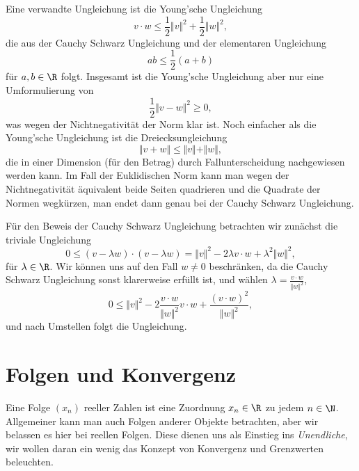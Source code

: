 \documentclass[letterpaper,10pt,english]{jupyterBook}
\begin{document}
Eine verwandte Ungleichung ist die Young’sche Ungleichung
\begin{equation*}
  v \cdot w \leq \frac{1}2 \Vert v \Vert^2 + \frac{1}2\Vert w  \Vert^2,\end{equation*}
die aus der Cauchy Schwarz Ungleichung und der elementaren Ungleichung
\begin{equation*}
 ab \leq \frac{1}2 (a+b)\end{equation*}
für \(a,b \in \R\) folgt. Insgesamt ist die Young’sche Ungleichung aber nur eine Umformulierung von
\begin{equation*}
 \frac{1}2 \Vert v - w \Vert^2 \geq 0,\end{equation*}
was wegen der Nichtnegativität der Norm klar ist. Noch einfacher als die Young’sche Ungleichung ist die Dreiecksungleichung
\begin{equation*}
 \Vert v + w\Vert \leq \Vert v \Vert + \Vert w \Vert,\end{equation*}
die in einer Dimension (für den Betrag) durch Fallunterscheidung nachgewiesen werden kann. Im Fall der Euklidischen Norm kann man wegen der Nichtnegativität äquivalent beide Seiten quadrieren und die Quadrate der Normen wegkürzen, man endet dann genau bei der Cauchy Schwarz Ungleichung.

Für den Beweis der Cauchy Schwarz Ungleichung betrachten wir zunächst die triviale Ungleichung
\begin{equation*}
 0 \leq (v-\lambda w)\cdot (v-\lambda w) = \Vert v \Vert^2 - 2 \lambda v \cdot w + \lambda^2 \Vert w \Vert^2,\end{equation*}
für \(\lambda \in \R\). Wir können uns auf den Fall \(w \neq 0\) beschränken, da die Cauchy Schwarz Ungleichung sonst klarerweise erfüllt ist, und wählen \(\lambda = \frac{v\cdot w}{\Vert w \Vert^2}\),
\begin{equation*}
 0 \leq  \Vert v \Vert^2 - 2 \frac{v\cdot w}{\Vert w \Vert^2}  v \cdot w + \frac{(v\cdot w)^2}{\Vert w \Vert^2} ,\end{equation*}
und nach Umstellen folgt die Ungleichung.


\section{Folgen und Konvergenz}
\label{\detokenize{vorkurs/folgen:folgen-und-konvergenz}}\label{\detokenize{vorkurs/folgen::doc}}
Eine Folge \((x_n)\) reeller Zahlen ist eine Zuordnung \(x_n \in \R\) zu jedem \(n \in \N\). Allgemeiner kann man auch Folgen anderer Objekte betrachten, aber wir belassen es hier bei reellen Folgen. Diese dienen uns als Einstieg ins \emph{Unendliche}, wir wollen daran ein wenig das Konzept von Konvergenz und Grenzwerten beleuchten.
\end{document}
